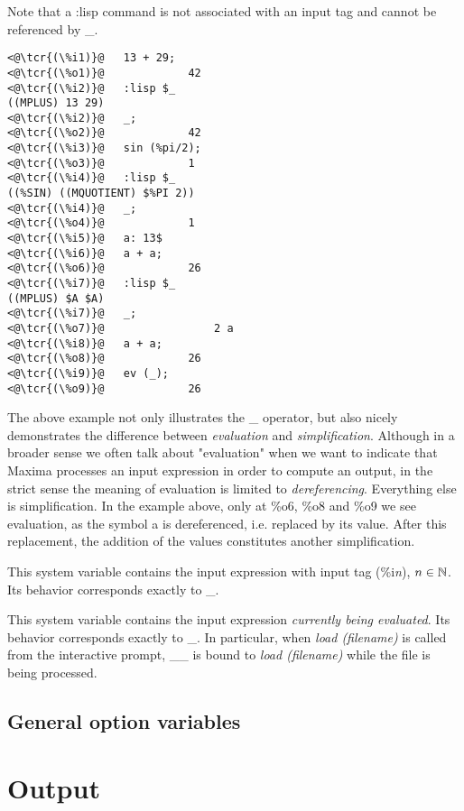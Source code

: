 \documentclass[../Maxima_Workbook.tex]{subfiles}
\begin{document}
\lz Note that a :lisp command is not associated with an input tag and cannot be referenced by \_.

\lz \begin{lstlisting}
<@\tcr{(\%i1)}@   13 + 29;
<@\tcr{(\%o1)}@				42
<@\tcr{(\%i2)}@   :lisp $_
((MPLUS) 13 29)
<@\tcr{(\%i2)}@   _;
<@\tcr{(\%o2)}@				42
<@\tcr{(\%i3)}@   sin (%pi/2);
<@\tcr{(\%o3)}@				1
<@\tcr{(\%i4)}@   :lisp $_
((%SIN) ((MQUOTIENT) $%PI 2))
<@\tcr{(\%i4)}@   _;
<@\tcr{(\%o4)}@				1
<@\tcr{(\%i5)}@   a: 13$
<@\tcr{(\%i6)}@   a + a;
<@\tcr{(\%o6)}@				26
<@\tcr{(\%i7)}@   :lisp $_
((MPLUS) $A $A)
<@\tcr{(\%i7)}@   _;
<@\tcr{(\%o7)}@			        2 a
<@\tcr{(\%i8)}@   a + a;
<@\tcr{(\%o8)}@				26
<@\tcr{(\%i9)}@   ev (_);
<@\tcr{(\%o9)}@				26
\end{lstlisting}

\lz The above example not only illustrates the \_ operator, but also nicely demonstrates the difference between \emph{evaluation} and \emph{simplification}. Although in a broader sense we often talk about "evaluation" when we want to indicate that Maxima processes an input expression in order to compute an output, in the strict sense the meaning of evaluation is limited to \emph{dereferencing}. Everything else is simplification. In the example above, only at \%o6, \%o8 and \%o9 we see evaluation, as the symbol a is dereferenced, i.e. replaced by its value. After this replacement, the addition of the values constitutes another simplification.

\lzz {} \hfill \tcr{[variable]}

\lz This system variable contains the input expression with input tag (\%i\emph{n}), $ n \in \mathbb{N} $. Its behavior corresponds exactly to \_.

\lzz {} \hfill \tcr{[variable]}\index{\_\_}

\lz This system variable contains the input expression \emph{currently being evaluated}. Its behavior corresponds exactly to \_. In particular, when \emph{load (filename)} is called from the interactive prompt, \_\_ is bound to \emph{load (filename)} while the file is being processed.

\subsection{General option variables}

\section{Output}
\end{document}
